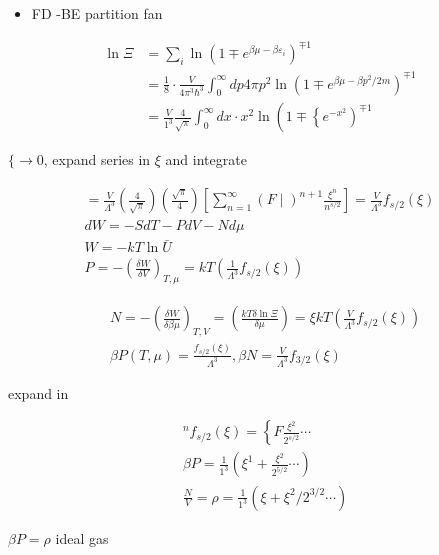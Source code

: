 \documentclass[10pt]{article}
\begin{document}
\begin{itemize}
  \item FD -BE partition fan
\end{itemize}

$$
\begin{aligned}
\ln \Xi & =\sum_{i} \ln \left(1 \mp e^{\beta \mu-\beta \varepsilon_{i}}\right)^{\mp 1} \\
& =\frac{1}{8} \cdot \frac{V}{4 \pi^{3} \hbar^{3}} \int_{0}^{\infty} d p 4 \pi p^{2} \ln \left(1 \mp e^{\beta \mu-\beta p^{2} / 2 m}\right)^{\mp 1} \\
& =\frac{V}{1^{3}} \frac{4}{\sqrt{\pi}} \int_{0}^{\infty} d x \cdot x^{2} \ln \left(1 \mp\left\{e^{-x^{2}}\right)^{\mp 1}\right.
\end{aligned}
$$

$\{\rightarrow 0$, expand series in $\xi$ and integrate

$$
\begin{gathered}
=\frac{V}{\Lambda^{3}}\left(\frac{4}{\sqrt{\pi}}\right)\left(\frac{\sqrt{\pi}}{4}\right)\left[\sum_{n=1}^{\infty}(F \mid)^{n+1} \frac{\xi^{n}}{n^{s / 2}}\right]=\frac{V}{\Lambda^{3}} f_{s / 2}(\xi) \\
d W=-S d T-P d V-N d \mu \\
W=-k T \ln \bar{U} \\
P=-\left(\frac{\delta W}{\delta V}\right)_{T, \mu}=k T\left(\frac{1}{\Lambda^{3}} f_{s / 2}(\xi)\right)
\end{gathered}
$$

$$
\begin{aligned}
& N=-\left(\frac{\delta W}{\delta \beta \mu}\right)_{T, V}=\left(\frac{k T \delta \ln \Xi}{\delta \mu}\right)=\xi k T\left(\frac{V}{\Lambda^{3}} f_{s / 2}(\xi)\right) \\
& \beta P(T, \mu)=\frac{f_{s / 2}(\xi)}{\Lambda^{3}}, \beta N=\frac{V}{\Lambda^{3}} f_{3 / 2}(\xi)
\end{aligned}
$$

expand in

$$
\begin{aligned}
& { }^{n} f_{s / 2}(\xi)=\left\{F \frac{\xi^{2}}{2^{s / 2}} \cdots\right. \\
& \beta P=\frac{1}{1^{3}}\left(\xi^{1}+\frac{\xi^{2}}{2^{5 / 2}} \cdots\right) \\
& \frac{N}{V}=\rho=\frac{1}{1^{3}}\left(\xi+\xi^{2} / 2^{3 / 2} \cdots\right)
\end{aligned}
$$

$\beta P=\rho$ ideal gas
\end{document}
